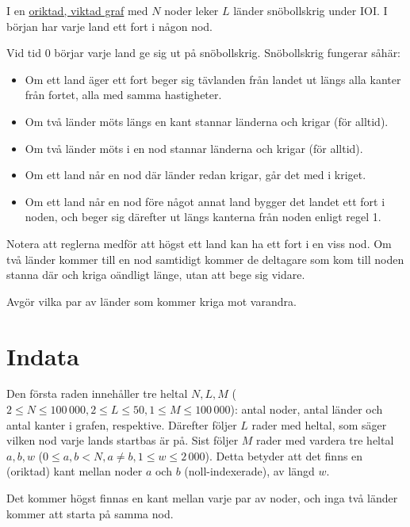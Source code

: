 I en \href{https://sv.wikipedia.org/wiki/Graf_(grafteori)}{oriktad, viktad graf}
med $N$ noder leker $L$ länder snöbollskrig under IOI.
I början har varje land ett fort i någon nod.

Vid tid $0$ börjar varje land ge sig ut på snöbollskrig. Snöbollskrig fungerar såhär:

\begin{itemize}
\item Om ett land äger ett fort beger sig tävlanden från landet ut längs alla kanter från fortet, alla med samma hastigheter.
\item Om två länder möts längs en kant stannar länderna och krigar (för alltid).
\item Om två länder möts i en nod stannar länderna och krigar (för alltid).
\item Om ett land når en nod där länder redan krigar, går det med i kriget.
\item Om ett land når en nod före något annat land bygger det landet ett fort i noden, och beger sig därefter ut längs kanterna från noden enligt regel 1.
\end{itemize}

Notera att reglerna medför att högst ett land kan ha ett fort i en viss nod.
Om två länder kommer till en nod samtidigt kommer de deltagare som kom till noden stanna där och kriga oändligt länge, utan att bege sig vidare.

Avgör vilka par av länder som kommer kriga mot varandra.

\section*{Indata}

Den första raden innehåller tre heltal $N,L,M$ ($2 \le N \le 100\,000, 2 \le L \le 50, 1 \le M \le 100\,000$):
antal noder, antal länder och antal kanter i grafen, respektive.
Därefter följer $L$ rader med heltal, som säger vilken nod varje lands startbas är på.
Sist följer $M$ rader med vardera tre heltal $a, b, w$ ($0 \le a,b < N, a \neq b, 1 \le w \le 2\,000$).
Detta betyder att det finns en (oriktad) kant mellan noder $a$ och $b$ (noll-indexerade), av längd $w$.

Det kommer högst finnas en kant mellan varje par av noder, och inga två länder kommer att starta på samma nod.

